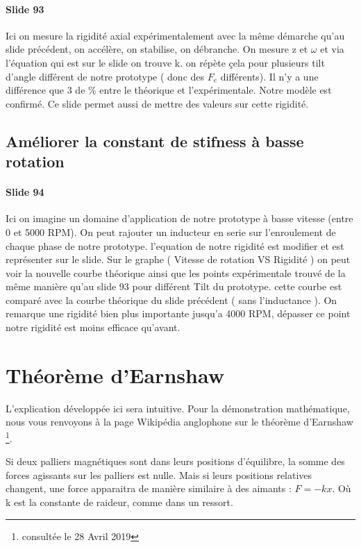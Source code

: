 \paragraph{Slide 93} Ici on mesure la rigidité axial expérimentalement avec la même démarche qu'au slide précédent, on accélère, on stabilise, on débranche. On mesure z et $\omega$ et via l'équation qui est sur le slide on trouve k. on répète çela pour plusieurs tilt d'angle différent de notre prototype ( donc des $F_e$ différents). Il n'y a une différence que 3 de \% entre le théorique et l'expérimentale. Notre modèle est confirmé. Ce slide permet aussi de mettre des valeurs sur cette rigidité. 

\subsection{Améliorer la constant de stifness à basse rotation}

\paragraph{Slide 94} Ici on imagine un domaine d'application de notre prototype à basse vitesse (entre 0 et 5000 RPM). On peut rajouter un inducteur en serie sur l'enroulement de chaque phase de notre  prototype. l'equation de notre rigidité est modifier et est représenter sur le slide. Sur le graphe ( Vitesse de rotation VS Rigidité ) on peut voir la nouvelle courbe théorique ainsi que les points expérimentale trouvé de la même manière qu'au slide 93 pour différent Tilt du prototype. cette courbe est comparé avec la courbe théorique du slide précédent ( sans l'inductance ). On remarque une rigidité bien plus importante jusqu'a 4000 RPM, dépasser ce point notre rigidité est moins efficace qu'avant. 

\appendix

\section{Théorème d'Earnshaw}
L'explication développée ici sera intuitive. Pour la démonstration mathématique, nous vous renvoyons à la page Wikipédia anglophone sur le théorème d'Earnshaw \footnote{consultée le 28 Avril 2019}.

Si deux palliers magnétiques sont dans leurs positions d'équilibre, la somme des forces agissants sur les palliers est nulle. Mais si leurs positions relatives changent, une force apparaitra de manière similaire à des aimants : $F = -kx$. Où k est la constante de raideur, comme dans un ressort.

